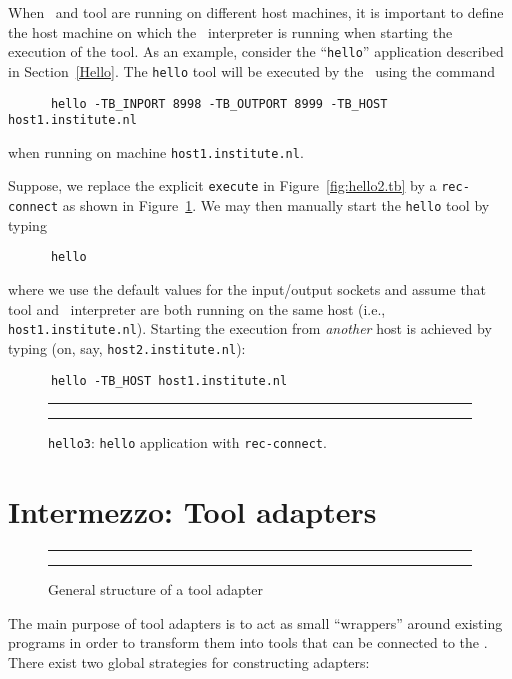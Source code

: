 \noindent When \TB\ and tool are running on different host machines, it is important
to define the host machine on which the \TB\ interpreter is running
when starting the execution of the tool.
As an example, consider the ``{\tt hello}'' application described in Section~\ref{Hello}.
The {\tt hello} tool will be executed by the \TB\ using
the command
\begin{verbatim}
      hello -TB_INPORT 8998 -TB_OUTPORT 8999 -TB_HOST host1.institute.nl
\end{verbatim}
when running on machine {\tt host1.institute.nl}.

Suppose, we replace the explicit {\tt execute} in Figure~\ref{fig:hello2.tb}
by a {\tt rec-connect} as shown in Figure~\ref{fig:hello3.tb}.
We may then manually start the
{\tt hello} tool by typing
\begin{verbatim}
      hello
\end{verbatim}
where we use the default values for the input/output sockets and assume
that tool and \TB\ interpreter are both running on the same host (i.e., {\tt host1.institute.nl}).
Starting the execution from {\em another} host is achieved by typing
(on, say, {\tt host2.institute.nl}):
\begin{verbatim}
      hello -TB_HOST host1.institute.nl
\end{verbatim}

\begin{figure}[tb]
\rule{\textwidth}{0.5mm}

  \caption{{\tt hello3}: {\tt hello} application with {\tt rec-connect}.}
  \label{fig:hello3.tb}
\rule{\textwidth}{0.5mm}
\end{figure}

\section{Intermezzo: Tool adapters}
\begin{figure}[t]
\rule{\textwidth}{0.5mm}
  
  \centerline{\box\graph}
  \caption{General structure of a tool adapter}
  \label{fig:adapter}
\rule{\textwidth}{0.5mm}
\end{figure}

The main purpose of tool adapters is to act as small ``wrappers'' around
existing programs in order to transform them into tools that
can be connected to the \TB. There exist two global strategies
for constructing adapters:

